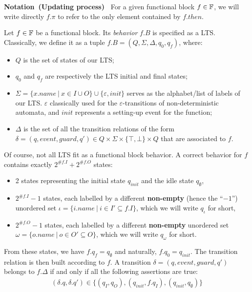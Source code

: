 \documentclass[runningheads]{llncs}
\newcommand{\Notation}[1]{\noindent\textbf{Notation~(#1)~}}
\begin{document}
\Notation{Updating process} For a given functional block $f \in \mathbb{F}$, we will write directly $f.\pi$ to refer to the only element contained by $f.then$.  

\begin{definition}\label{functional_block_behavior}
    Let $f\in\mathbb{F}$ be a functional block. Its \emph{behavior} $f.B$ is specified as a LTS. Classically, we define it as a tuple $ f.B = (Q, \Sigma, \Delta, q_0, q_f)$, where:
    \begin{itemize}
        \item $Q$ is the set of states of our LTS;
        \item $q_0$ and $q_f$ are respectively the LTS initial and final states;
        \item $\Sigma = \{x.name~|~x \in I \cup O\}\cup \{\varepsilon, init\}$ serves as the alphabet/list of labels of our LTS. $\varepsilon$ classically used for the $\varepsilon$-transitions of non-deterministic automata, and $init$ represents a setting-up event for the function;
        \item $\Delta$ is the set of all the transition relations of the form $\delta = (q, event, guard, q') \in Q \times \Sigma \times \{\top,\bot\} \times Q$ that are associated to $f$.
    \end{itemize}
    Of course, not all LTS fit as a functional block behavior. A correct behavior for $f$ contains exactly $2^{\#f.I} + 2^{\#f.O}$ states:
    \begin{itemize}
        \item 2 states representing the initial state $q_{init}$ and the idle state $q_{\emptyset}$,
        \item $2^{\#f.I}-1$ states, each labelled by a different \textbf{non-empty} (hence the ``$-1$'') unordered set $\iota=\{i.name~|~i\in I'\subseteq f.I\}$, which we will write $q_\iota$ for short,
        \item $2^{\#f.O}-1$ states, each labelled by a different \textbf{non-empty} unordered set $\omega=\{o.name~|~o\in O'\subseteq O\}$, which we will write $q_\omega$ for short.
    \end{itemize}
    From these states, we have $f.q_f = q_{\emptyset}$ and naturally, $f.q_0 = q_{init}$. The transition relation is then built according to $f$. A transition $\delta = (q, event, guard, q')$ belongs to $f.\Delta$ if and only if all the following assertions are true:
    \begin{multline}
        (\delta.q, \delta.q')\in \{(q_I,q_O), (q_{init},f.q_I), (q_{init}, q_\emptyset)\}\\

\end{multline}
\end{definition}
\end{document}
